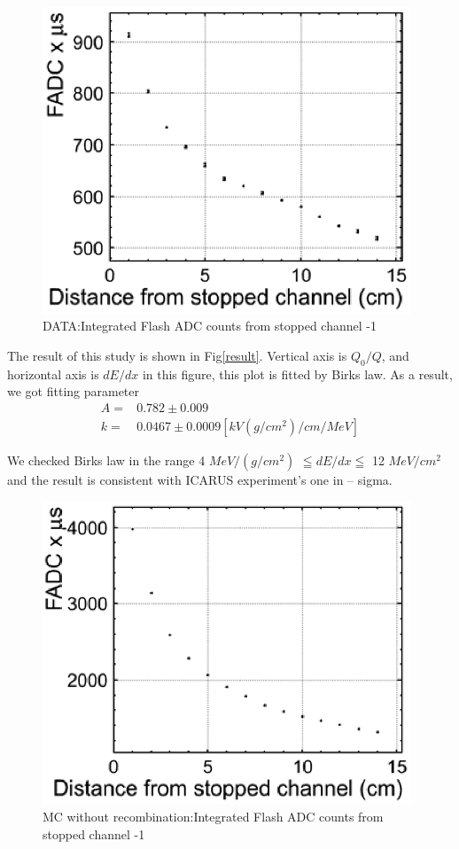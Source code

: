 \begin{figure}[!htb]
  \centering
  \centering
  \includegraphics[width=11cm,clip]{./fig/q.eps}
  \caption{DATA:Integrated Flash ADC counts from stopped channel -1}
  \label{fadcDist1}
\end{figure}
\pagebreak
\pagebreak

The result of this study is shown in Fig\ref{result}. Vertical axis is $Q_{0}/Q$, and horizontal axis is $dE/dx$ in this figure, this plot is fitted by Birks law.
As a result, we got fitting parameter\\
\begin{eqnarray}
 \nonumber  A =& 0.782\pm0.009\\
   k =& 0.0467\pm0.0009 [kV(g/cm^{2})/cm/MeV]
\end{eqnarray}

We checked Birks law in the range 4 $MeV/(g/cm^2)$ $\leqq dE/dx \leqq$ 12 $MeV/cm^2$ and the result is consistent with ICARUS experiment's one\cite{658352} in -- sigma.

\begin{figure}[!htb]
  \centering
  \centering
  \includegraphics[width=11cm,clip]{./fig/q_0.eps}
  \caption{MC without recombination:Integrated Flash ADC counts from stopped channel -1}
  \label{fadcDistMC}
\end{figure}

